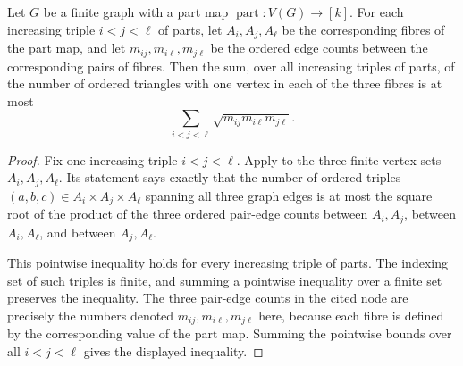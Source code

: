 \begin{helper}
Let $G$ be a finite graph with a part map
$\operatorname{part}:V(G)\to [k]$.  For each increasing triple
$i<j<\ell$ of parts, let $A_i,A_j,A_\ell$ be the corresponding fibres of
the part map, and let $m_{ij},m_{i\ell},m_{j\ell}$ be the ordered edge
counts between the corresponding pairs of fibres.  Then the sum, over all
increasing triples of parts, of the number of ordered triangles with one
vertex in each of the three fibres is at most
\[
\sum_{i<j<\ell}\sqrt{m_{ij}m_{i\ell}m_{j\ell}}.
\]
\end{helper}
\begin{proof}
Fix one increasing triple $i<j<\ell$.  Apply
 to the three finite vertex
sets $A_i,A_j,A_\ell$.  Its statement says exactly that the number of ordered
triples $(a,b,c)\in A_i\times A_j\times A_\ell$ spanning all three graph
edges is at most the square root of the product of the three ordered
pair-edge counts between $A_i,A_j$, between $A_i,A_\ell$, and between
$A_j,A_\ell$.

This pointwise inequality holds for every increasing triple of parts.  The
indexing set of such triples is finite, and summing a pointwise inequality
over a finite set preserves the inequality.  The three pair-edge counts in
the cited node are precisely the numbers denoted
$m_{ij},m_{i\ell},m_{j\ell}$ here, because each fibre is defined by the
corresponding value of the part map.  Summing the pointwise bounds over all
$i<j<\ell$ gives the displayed inequality.
\end{proof}
